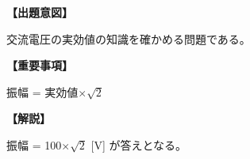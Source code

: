 \noindent \textbf{【出題意図】}

\noindent 交流電圧の実効値の知識を確かめる問題である。

\vspace{1em}
\noindent \textbf{【重要事項】}

\medskip
振幅 = 実効値$\times \sqrt{2}$

\vspace{1em}
\noindent \textbf{【解説】}

\noindent 振幅 = 100$\times \sqrt{2}$ [V] が答えとなる。
